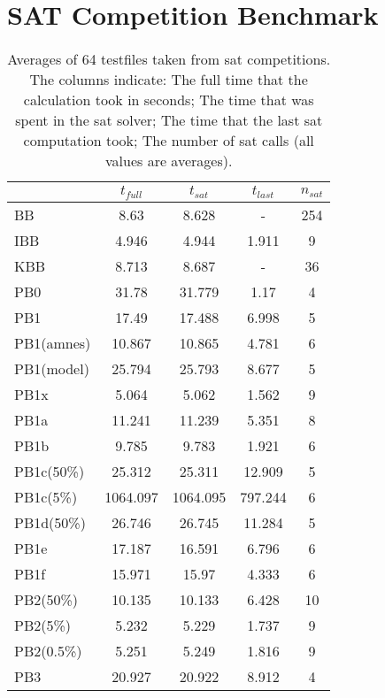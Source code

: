 \section{SAT Competition Benchmark}
\begin{wraptable}{r}{8.5cm} %
\begin{tabular}{l| c c c c}
 & $t_{full}$ & $t_{sat}$ & $t_{last}$& $n_{sat}$ \\
 \hline
BB & 8.63 & 8.628 & - & 254\\
IBB & 4.946 & 4.944 & 1.911 & 9\\
KBB & 8.713 & 8.687 & - & 36\\
PB0 & 31.78 & 31.779 & 1.17 & 4\\
PB1 & 17.49 & 17.488 & 6.998 & 5\\
PB1(amnes) & 10.867 & 10.865 & 4.781 & 6\\
PB1(model) & 25.794 & 25.793 & 8.677 & 5\\
PB1x & 5.064 & 5.062 & 1.562 & 9\\
PB1a & 11.241 & 11.239 & 5.351 & 8\\
PB1b & 9.785 & 9.783 & 1.921 & 6\\
PB1c(50\%) & 25.312 & 25.311 & 12.909 & 5\\
PB1c(5\%) & 1064.097 & 1064.095 & 797.244 & 6\\
PB1d(50\%) & 26.746 & 26.745 & 11.284 & 5\\
PB1e & 17.187 & 16.591 & 6.796 & 6\\
PB1f & 15.971 & 15.97 & 4.333 & 6\\
PB2(50\%) & 10.135 & 10.133 & 6.428 & 10\\
PB2(5\%) & 5.232 & 5.229 & 1.737 & 9\\
PB2(0.5\%) & 5.251 & 5.249 & 1.816 & 9\\
PB3 & 20.927 & 20.922 & 8.912 & 4\\
\end{tabular}
\caption{Averages of 64 testfiles taken from sat competitions. The columns indicate: The full time that the calculation took in seconds; The time that was spent in the sat solver; The time that the last sat computation took; The number of sat calls (all values are averages).}
\label{tab:satCompAvg} %
\end{wraptable}

